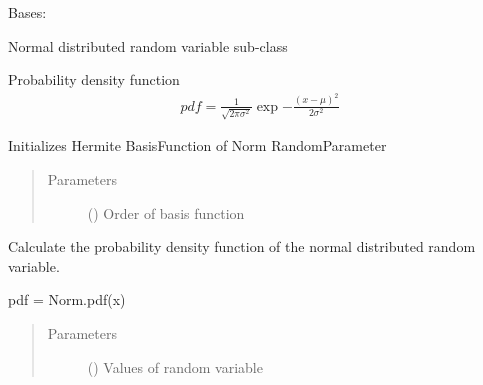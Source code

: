\documentclass[letterpaper,10pt,english,openany,oneside]{sphinxmanual}
\begin{document}
\begin{fulllineitems}
\label{\detokenize{pygpc:pygpc.RandomParameter.Norm}}
Bases: {\hyperref[\detokenize{pygpc:pygpc.RandomParameter.RandomParameter}]{}}

Normal distributed random variable sub-class

Probability density function
\begin{equation*}
\begin{split}pdf = \frac{1}{\sqrt{2\pi\sigma^2}}\exp{-\frac{(x-\mu)^2}{2\sigma^2}}\end{split}
\end{equation*}

\begin{fulllineitems}
\label{\detokenize{pygpc:pygpc.RandomParameter.Norm.init_basis_function}}
Initializes Hermite BasisFunction of Norm RandomParameter
\begin{quote}\begin{description}
\item[{Parameters}] \leavevmode
{} () \textendash{} Order of basis function

\end{description}\end{quote}

\end{fulllineitems}


\begin{fulllineitems}
\label{\detokenize{pygpc:pygpc.RandomParameter.Norm.pdf}}
Calculate the probability density function of the normal distributed random variable.

pdf = Norm.pdf(x)
\begin{quote}\begin{description}
\item[{Parameters}] \leavevmode
{} (\sphinxstyleliteralemphasis{\sphinxupquote{ {[}}}\sphinxstyleliteralemphasis{\sphinxupquote{{]}}}) \textendash{} Values of random variable


\end{description}
\end{quote}
\end{fulllineitems}
\end{fulllineitems}
\end{document}
